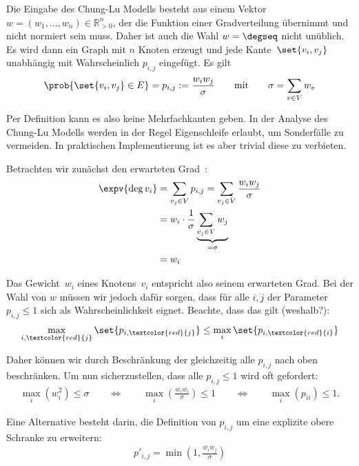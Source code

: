Die Eingabe des Chung-Lu Modells besteht aus einem Vektor $w = (w_1, \ldots, w_n) \in \mathbb{R}_{>0}^n$, der die Funktion einer Gradverteilung übernimmt und nicht normiert sein muss.
Daher ist auch die Wahl $w = \degseq$ nicht unüblich.
Es wird dann ein Graph mit $n$ Knoten erzeugt und jede Kante~$\set{v_i,v_j}$ unabhängig mit Wahrscheinlich $p_{i,j}$ eingefügt.
Es gilt
\begin{align}
    \prob{\set{v_i,v_j} \in E} = p_{i,j} := \frac{w_iw_j}{\sigma} \qquad \text{mit} \qquad \sigma = \sum_{v \in V} w_v
\end{align}

Per Definition kann es also keine Mehrfachkanten geben.
In der Analyse des Chung-Lu Modells werden in der Regel Eigenschleife erlaubt, um Sonderfälle zu vermeiden.
In praktischen Implementierung ist es aber trivial diese zu verbieten.

Betrachten wir zunächst den erwarteten Grad~:
\begin{align}
    \expv{\deg{v_i}} & = \sum_{v_j \in V} p_{i,j} = \sum_{v_j \in V} \frac{w_iw_j}{\sigma}      \\
                     & =w_i \cdot \frac{1}{\sigma} \underbrace{\sum_{v_j \in V} w_j}_{= \sigma} \\
                     & = w_i
\end{align}

Das Gewicht~$w_i$ eines Knotens~$v_i$ entspricht also seinem erwarteten Grad.
Bei der Wahl von $w$ müssen wir jedoch dafür sorgen, dass für alle $i, j$ der Parameter~$p_{i,j} \le 1$ sich als Wahrscheinlichkeit eignet.
Beachte, dass das gilt (weshalb?):
\begin{align}
    \max_{i,\textcolor{red}{j}} \set{p_{i,\textcolor{red}{j}}} \le \max_{i}\set{p_{i,\textcolor{red}{i}}}
\end{align}

Daher können wir durch Beschränkung der  gleichzeitig alle $p_{i,j}$ nach oben beschränken.
Um nun sicherzustellen, dass alle $p_{i,j} \le 1$ wird oft gefordert:
\begin{align}
    \max_i{\left(w_i^2\right)} \le \sigma
    \qquad \Leftrightarrow \qquad \max_i{\left(\frac{w_iw_i}{\sigma}\right)} \le 1
    \qquad \Leftrightarrow \qquad \max_i{\left(p_{ii}\right)} \le 1.
\end{align}

Eine Alternative besteht darin, die Definition von $p_{i,j}$ um eine explizite obere Schranke zu erweitern:
\begin{align}
    p'_{i,j} = \min(1, \frac{w_iw_j}{\sigma})
\end{align}

